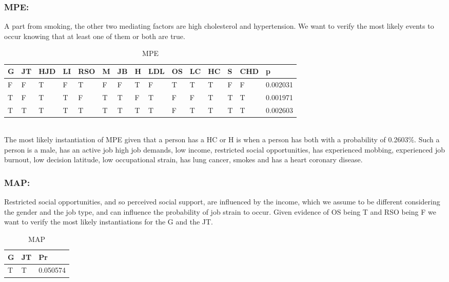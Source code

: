 \subsubsection{MPE:}
A part from smoking, the other two mediating factors are high cholesterol and hypertension. We want to verify the most likely events to occur knowing that at least one of them or both are true.
\\
\begin{table}
\centering
\caption{MPE}\label{tab3}
\begin{tabular}{p{0.6cm} p{0.6cm} p{0.6cm}p{0.6cm}p{0.6cm}p{0.6cm}p{0.6cm}p{0.6cm}p{0.6cm}p{0.6cm}p{0.6cm}p{0.6cm}p{0.6cm}p{0.6cm}p{0.6cm}}
G & JT & HJD & LI & RSO & M & JB & H & LDL & OS & LC & HC & S & CHD & p
\\
\hline
F & F & T & F & T & F & F & T & F & T & T & T &
   F & F & 0.002031\\
T & F & T & T & F & T & T & F & T & F & F & T & T &
   T & 0.001971\\
T & T & T & T & T & T & T & T & T & F & T & T & T & T & 0.002603\\
\end{tabular}
\end{table}
\\
The most likely instantiation of MPE given that a person has a HC or H is when a person has both with a probability of 0.2603\%. Such a person is a male, has an active job high job demands, low income, restricted social opportunities, has experienced mobbing, experienced job burnout, low decision latitude, low occupational strain, has lung cancer, smokes and has a heart coronary disease. 

\subsubsection{MAP:} 
Restricted social opportunities, and so perceived social support, are influenced by the income, which we assume to be different considering the gender and the job type, and can influence the probability of job strain to occur. Given evidence of OS being T and RSO being F we want to verify the most likely instantiations for the G and the JT. \\

\begin{table}
\centering
\caption{MAP}\label{tab3}
\begin{tabular}{p{1.2cm} p{1.2cm} p{1.2cm}}
G & JT & Pr\\
\hline
T & {T} & 0.050574\\
\end{tabular}
\end{table}



